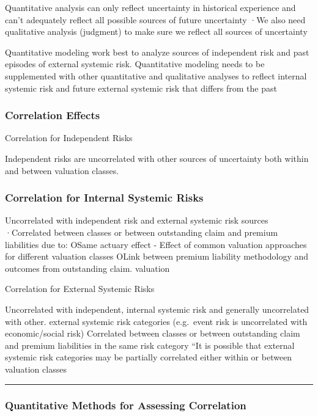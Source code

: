 \documentclass[
]{article}
\begin{document}
Quantitative analysis can only reflect uncertainty in historical
experience and can't adequately reflect all possible sources of future
uncertainty ·We also need qualitative analysis (judgment) to make sure
we reflect all sources of uncertainty

Quantitative modeling work best to analyze sources of independent risk
and past episodes of external systemic risk. Quantitative modeling needs
to be supplemented with other quantitative and qualitative analyses to
reflect internal systemic risk and future external systemic risk that
differs from the past

\subsubsection{Correlation Effects}\label{correlation-effects}

Correlation for Independent Risks

Independent risks are uncorrelated with other sources of uncertainty
both within and between valuation classes.

\subsubsection{Correlation for Internal Systemic
Risks}\label{correlation-for-internal-systemic-risks}

Uncorrelated with independent risk and external systemic risk sources
·Correlated between classes or between outstanding claim and premium
liabilities due to: OSame actuary effect - Effect of common valuation
approaches for different valuation classes OLink between premium
liability methodology and outcomes from outstanding claim. valuation

Correlation for External Systemic Risks

Uncorrelated with independent, internal systemic risk and generally
uncorrelated with other. external systemic risk categories (e.g.~event
risk is uncorrelated with economic/social risk) Correlated between
classes or between outstanding claim and premium liabilities in the same
risk category ``It is possible that external systemic risk categories
may be partially correlated either within or between valuation classes

\begin{center}\rule{0.5\linewidth}{0.5pt}\end{center}

\subsubsection{Quantitative Methods for Assessing
Correlation}\label{quantitative-methods-for-assessing-correlation}
\end{document}
